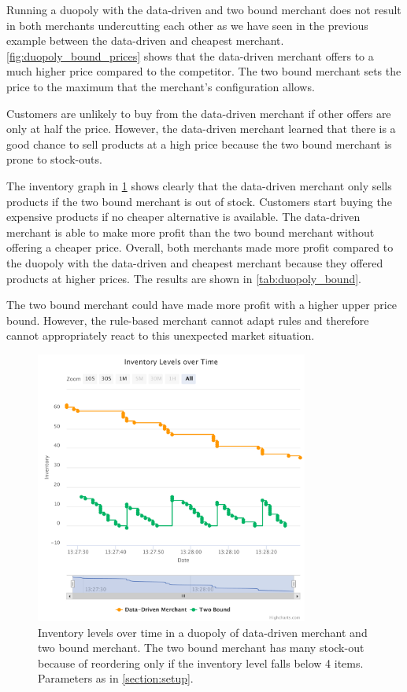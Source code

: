 Running a duopoly with the data-driven and two bound merchant does not result in both merchants undercutting each other as we have seen in the previous example between the data-driven and cheapest merchant.
\cref{fig:duopoly_bound_prices} shows that the data-driven merchant offers to a much higher price compared to the competitor.
The two bound merchant sets the price to the maximum that the merchant's configuration allows.

Customers are unlikely to buy from the data-driven merchant if other offers are only at half the price.
However, the data-driven merchant learned that there is a good chance to sell products at a high price because the two bound merchant is prone to stock-outs.

The inventory graph in \cref{fig:duopoly_bound_inventory} shows clearly that the data-driven merchant only sells products if the two bound merchant is out of stock.
Customers start buying the expensive products if no cheaper alternative is available.
The data-driven merchant is able to make more profit than the two bound merchant without offering a cheaper price.
Overall, both merchants made more profit compared to the duopoly with the data-driven and cheapest merchant because they offered products at higher prices.
The results are shown in \cref{tab:duopoly_bound}.

The two bound merchant could have made more profit with a higher upper price bound.
However, the rule-based merchant cannot adapt rules and therefore cannot appropriately react to this unexpected market situation.

\begin{figure}[t]
	\centering
	\includegraphics[width=0.8\textwidth]{figures/duopoly_bound_inventory}
	\caption[Inventory Levels: Data-Driven Merchant versus Two Bound Merchant]{Inventory levels over time in a duopoly of data-driven merchant and two bound merchant. The two bound merchant has many stock-out because of reordering only if the inventory level falls below 4 items. Parameters as in \cref{section:setup}.}
	\label{fig:duopoly_bound_inventory}
\end{figure}

